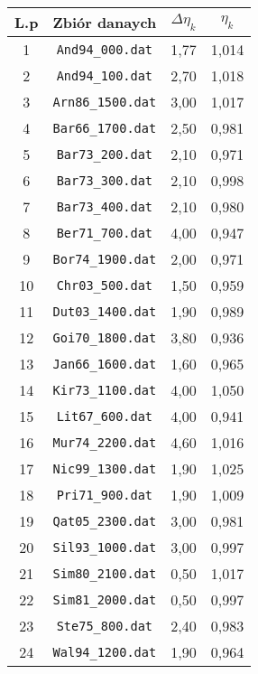 \documentclass[11pt]{book}
\theoremstyle{definition}
\begin{document}
\begin{table}
	\centering
	\caption{}\label{tab:etak} 
	
\begin{tabular}{c|c c c}
\hline 
L.p & Zbiór danaych & $\Delta \eta_k$ & $\eta_k$  \\\hline
1& \texttt{And94\_000.dat}&1,77&1,014\\ \hline
2& \texttt{And94\_100.dat}&2,70&1,018\\ \hline
3& \texttt{Arn86\_1500.dat}&3,00&1,017\\ \hline
4& \texttt{Bar66\_1700.dat}&2,50&0,981\\ \hline
5& \texttt{Bar73\_200.dat}&2,10&0,971\\ \hline
6& \texttt{Bar73\_300.dat}&2,10&0,998\\ \hline
7& \texttt{Bar73\_400.dat}&2,10&0,980\\ \hline
8& \texttt{Ber71\_700.dat}&4,00&0,947\\ \hline
9& \texttt{Bor74\_1900.dat}&2,00&0,971\\ \hline
10& \texttt{Chr03\_500.dat}&1,50&0,959\\ \hline
11& \texttt{Dut03\_1400.dat}&1,90&0,989\\ \hline
12& \texttt{Goi70\_1800.dat}&3,80&0,936\\ \hline
13& \texttt{Jan66\_1600.dat}&1,60&0,965\\ \hline
14& \texttt{Kir73\_1100.dat}&4,00&1,050\\ \hline
15& \texttt{Lit67\_600.dat}&4,00&0,941\\ \hline
16& \texttt{Mur74\_2200.dat}&4,60&1,016\\ \hline
17& \texttt{Nic99\_1300.dat}&1,90&1,025\\ \hline
18& \texttt{Pri71\_900.dat}&1,90&1,009\\ \hline
19& \texttt{Qat05\_2300.dat}&3,00&0,981\\ \hline
20& \texttt{Sil93\_1000.dat}&3,00&0,997\\ \hline
21& \texttt{Sim80\_2100.dat}&0,50&1,017\\ \hline
22& \texttt{Sim81\_2000.dat}&0,50&0,997\\ \hline
23& \texttt{Ste75\_800.dat}&2,40&0,983\\ \hline
24& \texttt{Wal94\_1200.dat}&1,90&0,964\\ \hline

\end{tabular}
\end{table}






\end{document}
